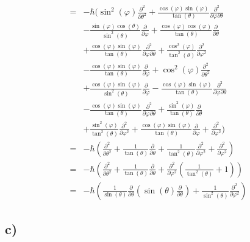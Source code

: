     \begin{align*}
    = &-\hbar ( \sin^2(\varphi)\frac{\partial^2}{\partial \theta^2} + \frac{\cos(\varphi)\sin(\varphi)}{\tan(\theta)} \frac{\partial^2}{\partial \varphi \partial \theta} \\
    &- \frac{\sin(\varphi)\cos(\theta)}{\sin^2(\theta)} \frac{\partial}{\partial \varphi} + \frac{\cos(\varphi)\cos(\varphi)}{\tan(\theta)} \frac{\partial}{\partial \theta}\\
    &+ \frac{\cos(\varphi)\sin(\varphi)}{\tan(\theta)}\frac{\partial^2}{\partial \varphi \partial \theta} + \frac{\cos^2(\varphi)}{\tan^2(\theta)} \frac{\partial^2}{\partial \varphi^2}\\
    &- \frac{\cos(\varphi)\sin(\varphi)}{\tan(\theta)}\frac{\partial}{\partial \varphi} + \cos^2(\varphi) \frac{\partial^2}{\partial \theta^2} \\
    &+ \frac{\cos(\varphi)\sin(\varphi)}{\sin^2(\theta)}\frac{\partial}{\partial \varphi} - \frac{\cos(\varphi)\sin(\varphi)}{\tan(\theta)} \frac{\partial^2}{\partial \varphi \partial \theta}\\
    &- \frac{\cos(\varphi)\sin(\varphi)}{\tan(\theta)} \frac{\partial^2}{\partial \varphi \partial \theta} + \frac{\sin^2(\varphi)}{\tan(\theta)} \frac{\partial}{\partial \theta}\\
    &+ \frac{\sin^2(\varphi)}{\tan^2(\theta)} \frac{\partial^2}{\partial \varphi^2} + \frac{\cos(\varphi)\sin(\varphi)}{\tan(\theta)} \frac{\partial}{\partial \varphi} + \frac{\partial^2}{\partial \varphi^2} )\\
    = &-\hbar \left( \frac{\partial^2}{\partial \theta^2} + \frac{1}{\tan(\theta)} \frac{\partial}{\partial \theta} + \frac{1}{\tan^2(\theta)} \frac{\partial^2}{\partial \varphi^2} + \frac{\partial^2}{\partial \varphi^2} \right)\\
    = &-\hbar \left( \frac{\partial^2}{\partial \theta^2} + \frac{1}{\tan(\theta)} \frac{\partial}{\partial \theta} + \frac{\partial^2}{\partial \varphi^2} \left( \frac{1}{\tan^2(\theta)} + 1 \right) \right)\\
    = &-\hbar \left( \frac{1}{\sin(\theta)} \frac{\partial}{\partial \theta} \left( \sin(\theta) \frac{\partial}{\partial \theta} \right) + \frac{1}{\sin^2(\theta)} \frac{\partial^2}{\partial \varphi^2} \right)
    \end{align*}

    \subsection{c)}

